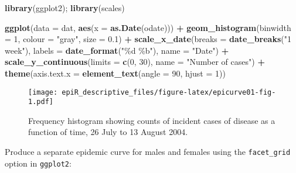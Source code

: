 \documentclass[
]{article}
\newenvironment{Shaded}{\begin{snugshade}}{\end{snugshade}}
\newcommand{\DataTypeTok}[1]{\textcolor[rgb]{0.13,0.29,0.53}{#1}}
\newcommand{\DecValTok}[1]{\textcolor[rgb]{0.00,0.00,0.81}{#1}}
\newcommand{\FloatTok}[1]{\textcolor[rgb]{0.00,0.00,0.81}{#1}}
\newcommand{\KeywordTok}[1]{\textcolor[rgb]{0.13,0.29,0.53}{\textbf{#1}}}
\newcommand{\NormalTok}[1]{#1}
\newcommand{\OperatorTok}[1]{\textcolor[rgb]{0.81,0.36,0.00}{\textbf{#1}}}
\newcommand{\StringTok}[1]{\textcolor[rgb]{0.31,0.60,0.02}{#1}}
\begin{document}
\begin{Shaded}
\begin{Highlighting}[]

\KeywordTok{library}\NormalTok{(ggplot2); }\KeywordTok{library}\NormalTok{(scales)}

\KeywordTok{ggplot}\NormalTok{(}\DataTypeTok{data =}\NormalTok{ dat, }\KeywordTok{aes}\NormalTok{(}\DataTypeTok{x =} \KeywordTok{as.Date}\NormalTok{(odate))) }\OperatorTok{+}
\StringTok{  }\KeywordTok{geom\_histogram}\NormalTok{(}\DataTypeTok{binwidth =} \DecValTok{1}\NormalTok{, }\DataTypeTok{colour =} \StringTok{"gray"}\NormalTok{, }\DataTypeTok{size =} \FloatTok{0.1}\NormalTok{) }\OperatorTok{+}
\StringTok{  }\KeywordTok{scale\_x\_date}\NormalTok{(}\DataTypeTok{breaks =} \KeywordTok{date\_breaks}\NormalTok{(}\StringTok{"1 week"}\NormalTok{), }\DataTypeTok{labels =} \KeywordTok{date\_format}\NormalTok{(}\StringTok{"\%d \%b"}\NormalTok{), }
     \DataTypeTok{name =} \StringTok{"Date"}\NormalTok{) }\OperatorTok{+}
\StringTok{  }\KeywordTok{scale\_y\_continuous}\NormalTok{(}\DataTypeTok{limits =} \KeywordTok{c}\NormalTok{(}\DecValTok{0}\NormalTok{, }\DecValTok{30}\NormalTok{), }\DataTypeTok{name =} \StringTok{"Number of cases"}\NormalTok{) }\OperatorTok{+}
\StringTok{  }\KeywordTok{theme}\NormalTok{(}\DataTypeTok{axis.text.x =} \KeywordTok{element\_text}\NormalTok{(}\DataTypeTok{angle =} \DecValTok{90}\NormalTok{, }\DataTypeTok{hjust =} \DecValTok{1}\NormalTok{))}
\end{Highlighting}
\end{Shaded}

\begin{figure}
\centering
\texttt{[image: epiR\_descriptive\_files/figure-latex/epicurve01-fig-1.pdf]}
\caption{\label{fig:epicurve01}Frequency histogram showing counts of
incident cases of disease as a function of time, 26 July to 13 August
2004.}
\end{figure}

Produce a separate epidemic curve for males and females using the
\texttt{facet\_grid} option in \texttt{ggplot2}:
\end{document}
